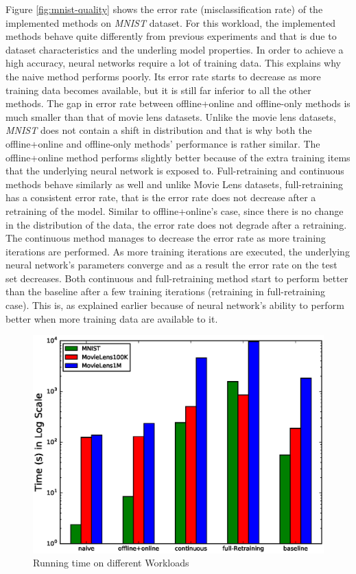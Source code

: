 \documentclass{sig-alternate-05-2015}
\begin{document}
Figure \ref{fig:mnist-quality} shows the error rate (misclassification rate) of the implemented methods on \textit{MNIST} dataset.
For this workload, the implemented methods behave quite differently from previous experiments and that is due to dataset characteristics and the underling model properties.
In order to achieve a high accuracy, neural networks require a lot of training data.
This explains why the naive method performs poorly.
Its error rate starts to decrease as more training data becomes available, but it is still far inferior to all the other methods.
The gap in error rate between offline+online and offline-only methods is much smaller than that of movie lens datasets.
Unlike the movie lens datasets, \textit{MNIST} does not contain a shift in distribution and that is why both the offline+online and offline-only methods' performance is rather similar.
The offline+online method performs slightly better because of the extra training items that the underlying neural network is exposed to.
Full-retraining and continuous methods behave similarly as well and unlike Movie Lens datasets, full-retraining has a consistent error rate, that is the error rate does not decrease after a retraining of the model.
Similar to offline+online's case, since there is no change in the distribution of the data, the error rate does not degrade after a retraining.
The continuous method manages to decrease the error rate as more training iterations are performed.
As more training iterations are executed, the underlying neural network's parameters converge and as a result the error rate on the test set decreases.
Both continuous and full-retraining method start to perform better than the baseline after a few training iterations (retraining in full-retraining case).
This is, as explained earlier because of neural network's ability to perform better when more training data are available to it.

\begin{figure}[h]
\centering
\includegraphics[width=\columnwidth]{../images/experiment-results/times-log-scale.eps}
 \caption{Running time on different Workloads}
 \label{fig:running-time}
 \end{figure}
\end{document}
